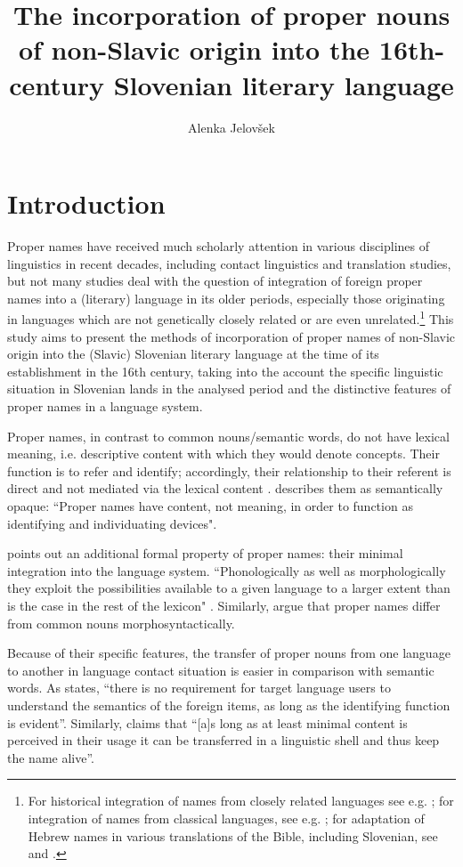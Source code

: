 \documentclass[output=paper,colorlinks,citecolor=brown,arabicfont,chinesefont]{langscibook}
\author{Alenka Jelovšek\affiliation{Research Centre of the Slovenian Academy of Sciences and Arts, Ljubljana, Slovenia}}
\title[Nouns of non-Slavic origin in 16th c. Slovenian literary language]
      {The incorporation of proper nouns of non-Slavic origin into the 16th-century Slovenian literary language}
\begin{document}
\maketitle

\section{Introduction}

Proper names have received much scholarly attention in various disciplines of linguistics in recent decades, including contact linguistics and translation studies, but not many studies deal with the question of integration of foreign proper names into a (literary) language in its older periods, especially those originating in languages which are not genetically closely related or are even unrelated.\footnote{For historical integration of names from closely related languages see e.g. \citealt{Casanova2012}; for integration of names from classical languages, see e.g. \citealt{Gordon2012}; for adaptation of Hebrew names in various translations of the Bible, including Slovenian, see \citealt{Krasovec2006} and \citealt{Krasovec2010}.} This study aims to present the methods of incorporation of proper names of non-Slavic origin into the (Slavic) Slovenian literary language at the time of its establishment in the 16th century, taking into the account the specific linguistic situation in Slovenian lands in the analysed period and the distinctive features of proper names in a language system.

Proper names, in contrast to common nouns/semantic words, do not have lexical meaning, i.e. descriptive content with which they would denote concepts. Their function is to refer and identify; accordingly, their relationship to their referent is direct and not mediated via the lexical content \citep[312]{SchluckerAckermann2017}. \citet[549]{Nicolaisen1996} describes them as semantically opaque: “Proper names have content, not meaning, in order to function as identifying and individuating devices".

\citet{Hermans2015} points out an additional formal property of proper names: their minimal integration into the language system. “Phonologically as well as morphologically they exploit the possibilities available to a given language to a larger extent than is the case in the rest of the lexicon" \citep[12]{Hermans2015}. Similarly, \citet{SchluckerAckermann2017} argue that proper names differ from common nouns morphosyntactically.

Because of their specific features, the transfer of proper nouns from one language to another in language contact situation is easier in comparison with semantic words. As \citet[94]{Raukko2017} states, “there is no requirement for target language users to understand the semantics of the foreign items, as long as the identifying function is evident”. Similarly, \citet[549]{Nicolaisen1996} claims that “[a]s long as at least minimal content is perceived in their usage it can be transferred in a linguistic shell and thus keep the name alive”. 
\end{document}
